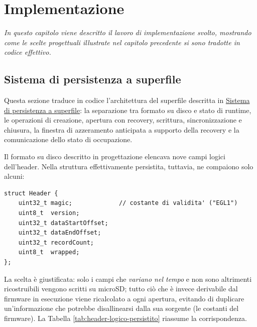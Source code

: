 \chapter{Implementazione}

\textit{In questo capitolo viene descritto il lavoro di implementazione svolto, mostrando come le scelte progettuali illustrate nel capitolo precedente
si sono tradotte in codice effettivo.}
\section{Sistema di persistenza a superfile} \label{sec:impl-superfile}

Questa sezione traduce in codice l'architettura del superfile descritta in
\hyperref[sec:superfile]{Sistema di persistenza a superfile}: la separazione tra
formato su disco e stato di runtime, le operazioni di creazione, apertura con
recovery, scrittura, sincronizzazione e chiusura, la finestra di azzeramento
anticipata a supporto della recovery e la comunicazione dello stato di occupazione.

Il formato su disco descritto in progettazione elencava nove campi logici
dell'header. Nella struttura effettivamente persistita, tuttavia, ne compaiono
solo alcuni:

\begin{listing}[H]
\begin{verbatim}
struct Header {
    uint32_t magic;             // costante di validita' ("EGL1")
    uint8_t  version;
    uint32_t dataStartOffset;
    uint32_t dataEndOffset;
    uint32_t recordCount;
    uint8_t  wrapped;
};
\end{verbatim}
\caption{Header effettivamente persistito su disco}
\label{listing:header-disco}
\end{listing}

La scelta è giustificata: solo i campi che \emph{variano nel tempo} e non sono
altrimenti ricostruibili vengono scritti su microSD; tutto ciò che è invece
 derivabile dal firmware in esecuzione viene ricalcolato a
ogni apertura, evitando di duplicare un'informazione che potrebbe disallinearsi
dalla sua sorgente (le costanti del firmware). La Tabella
\ref{tab:header-logico-persistito} riassume la corrispondenza.

